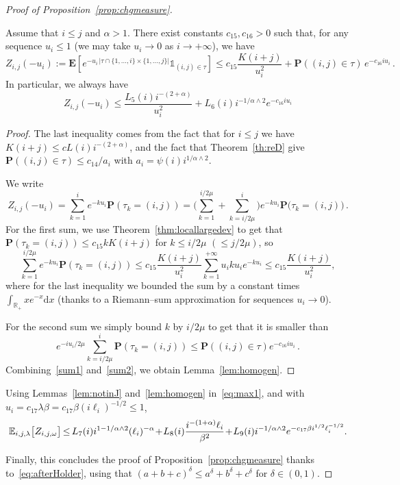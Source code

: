 \documentclass[AHL,Unicode,longabstracts]{cedram}
\newcommand{\ga}{\alpha}
\newcommand{\gb}{\beta}
\newcommand{\gd}{\delta}
\newcommand{\gl}{\lambda}
\newcommand{\unbf}%
{\mathds{1}}
\newcommand{\dd}{\mathrm{d}}
\newcommand{\bP}{\ensuremath{\mathbf{P}}}
\newcommand{\bE}{\ensuremath{\mathbf{E}}}
\newcommand{\bbE}{\ensuremath{\mathbb{E}}}
\newcommand{\bbR}{\ensuremath{\mathbb{R}}}
\newcommand*{\Mk}{\mkern -2mu}
\begin{document}
\begin{proof}[Proof of Proposition~\ref{prop:chgmeasure}]
\begin{lemm}\label{lem:homogen}
Assume that $i\leq j$ and $\ga>1$. There exist constants $c_{15},c_{16}>0$ such that, for any sequence $u_i \leq 1$ (we may take $u_i\to 0$ as $i\to+\infty$), we have
\[
Z_{i,j}(-u_i) := \bE\left[e^{- u_i\,\vert \tau \cap \lbrace 1,\dots,i \rbrace \times \lbrace 1,\dots,j \rbrace \vert } \unbf_{(i,j)\in\tau} \right]
\leq c_{15}\frac{K(i+j)}{u_i^2} + \bP((i,j)\in\tau)\,e^{ - c_{16} i u_i }\,.
\]
In particular, we always have
\[
Z_{i,j}(-u_i) \leq \frac{L_{5}(i) i^{-(2+\ga)}}{u_i^2} + L_{6} (i) i^{-1/\ga\wedge 2} e^{- c_{16} i u_i}
\]
\end{lemm}

\begin{proof}
The last inequality comes from the fact that for $i\leq j$ we have\linebreak $K(i+j) \leq c L(i) i^{-(2+\ga)}$, and the fact that Theorem~\ref{th:reD} give $\bP((i,j)\in\tau) \leq c_{14} /a_i$ with $a_i = \psi(i) i^{1/\ga\wedge 2}$.

We write
\[
Z_{i,j}(-u_{i}) = \sum_{k=1}^i e^{- k u_i} \bP(\tau_k = (i,j)) = \bigg(\sum_{k=1}^{i/2\mu} + \sum_{k=i/2\mu}^i \bigg) e^{- k u_i} \bP \big(\tau_k = (i,j) \big)\,.
\]
For the first sum, we use Theorem~\ref{thm:locallargedev} to get that $\bP(\tau_k = (i,j)) \leq c_{15} k K(i+j)$ for $k\leq i/2\mu$ $(\leq j/2\mu)$, so
\begin{equation}\label{sum1}
\sum_{k=1}^{i/2\mu} e^{- k u_i} \bP(\tau_k = (i,j)) \leq c_{15} \frac{K(i+j)}{u_i^2} \sum_{k=1}^{+\infty} u_i ku_i e^{-k u_i} \leq c_{15} \frac{K(i+j)}{u_i^2},
\end{equation}
where for the last inequality we bounded the sum by a constant times $\int_{\bbR_+} x e^{-x} \dd x$ (thanks to a Riemann--sum approximation for sequences $u_i\to 0$).

For the second sum we simply bound $k$ by $i/2\mu$ to get that it is smaller than
\begin{equation}\label{sum2}
e^{- i u_i /2\mu } \sum_{k=i/2\mu}^i \bP(\tau_k = (i,j)) \le \bP((i,j) \in\tau) e^{- c_{16} i u_i}\,.
\end{equation}
Combining~\eqref{sum1} and~\eqref{sum2}, we obtain Lemma~\ref{lem:homogen}.
\end{proof}

Using Lemmas~\ref{lem:notinJ} and~\ref{lem:homogen} in~\eqref{eq:max1}, and with $u_i= c_{17} \gl\gb = c_{17}\gb (i \ell_i)^{-1/2}\leq 1$,
\begin{equation}
\!\bbE_{i,j,\lambda} \big[Z_{i,j,\omega} \big] \Mk\leq\Mk L_{7}(i) i^{1-1/\ga\wedge 2} (\ell_i)^{-\ga}
\!+\! L_{8}(i) \frac{i^{-(1+\ga)} \ell_i}{\gb^2} \!+\! L_{9}(i) i^{-1/\ga\wedge 2} e^{- c_{17} \gb i^{1/2} \ell_i^{-1/2} }.\!
\end{equation}

Finally, this concludes the proof of Proposition~\ref{prop:chgmeasure} thanks to~\eqref{eq:afterHolder}, using that $(a+b+c)^{\gd} \leq a^\gd + b^{\gd} + c^{\gd}$ for $\gd\in(0,1)$.
\end{proof}
\end{document}
